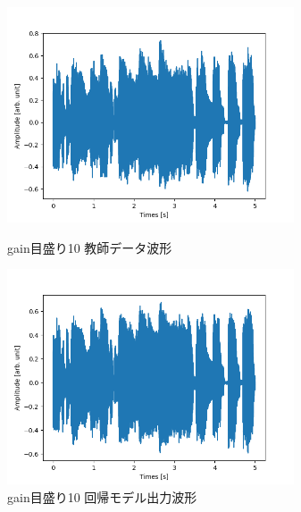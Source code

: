 \documentclass{jreport}		%
\begin{document}
\newpage
\begin{figure}[htbp]
 \begin{minipage}{0.5\hsize}
  \begin{center}
   \includegraphics[width=85mm]{gain10_output.png}
  \end{center}
  \caption{gain目盛り10 教師データ波形}
  \label{fig:one}
 \end{minipage}
 \begin{minipage}{0.5\hsize}
  \begin{center}
   \includegraphics[width=85mm]{gain10_predict_output.png}
  \end{center}
  \caption{gain目盛り10 回帰モデル出力波形}
  \label{fig:two}
 \end{minipage}
\end{figure}
\end{document}
